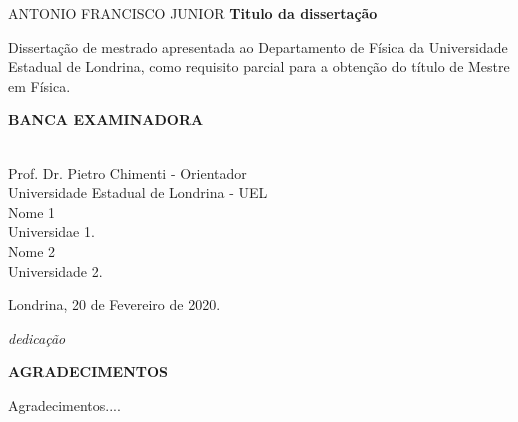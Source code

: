\documentclass[12pt,a4paper]{report}
\theoremstyle{definition}
\begin{document}
\newpage
\thispagestyle{empty}
\begin{center}
{\large \uppercase{ Antonio Francisco Junior }}
\vspace{2cm}
\Large \textbf{Titulo da dissertação} 
\normalsize
\vspace{2cm}
\end{center}
\noindent \hspace{7.cm} 
\begin{minipage}{8.5cm}{
\begin{singlespace} Dissertação de mestrado apresentada ao Departamento de Física da Universidade Estadual de Londrina, como requisito parcial para a obtenção do título de Mestre em Física.
\end{singlespace}}
\vspace{1.5cm}
\hspace{1.5cm} {\uppercase{ \bf Banca Examinadora}}
\vspace{1cm}
\begin{center}
\begin{singlespace}
\underline{\hspace{7cm}} \\
Prof. Dr. Pietro Chimenti - Orientador\\
Universidade Estadual de Londrina - UEL
\vspace{1cm}
\underline{\hspace{7cm}} \\
Nome 1 \\
Universidae 1.
\vspace{1cm}
\underline{\hspace{7cm}} \\
Nome 2 \\
Universidade 2.
\end{singlespace}
\vspace{2cm}
Londrina, 20 de Fevereiro de 2020.
\end{center}
\end{minipage}

\newpage
\thispagestyle{empty}
\vspace*{19cm}
\noindent \hspace{7.cm} 
\begin{minipage}{8.5cm}
\textit{dedicação}
\end{minipage}


\newpage
\thispagestyle{empty}
\begin{center}
{\bf AGRADECIMENTOS}
\end{center}
\vspace{1cm}
Agradecimentos....
\end{document}

